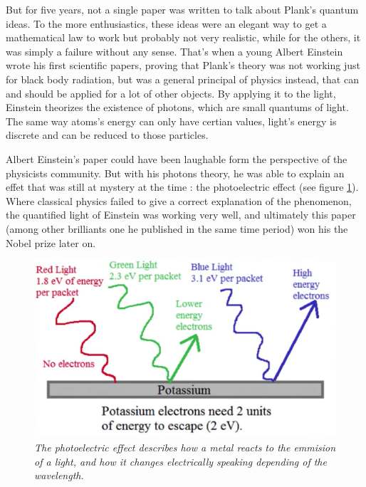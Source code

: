 \documentclass[a4paper,12pt]{report}
\newcommand{\para}[1]{\par{#1}\\}
\begin{document}
\para{
    But for five years, not a single paper was written to talk about Plank's quantum ideas. To the more enthusiastics, these ideas were an elegant way to get a mathematical law to work but probably not very realistic, while for the others, it was simply a failure without any sense. That's when a young Albert Einstein wrote his first scientific papers, proving that Plank's theory was not working just for black body radiation, but was a general principal of physics instead, that can and should be applied for a lot of other objects. By applying it to the light, Einstein theorizes the existence of photons, which are small quantums of light. The same way atoms's energy can only have certian values, light's energy is discrete and can be reduced to those particles.
}

\para{
    Albert Einstein's paper could have been laughable form the perspective of the physicists community. But with his photons theory, he was able to explain an effet that was still at mystery at the time : the photoelectric effect (see figure \ref{photoelectric}). Where classical physics failed to give a correct explanation of the phenomenon, the quantified light of Einstein was working very well, and ultimately this paper (among other brilliants one he published in the same time period) won his the Nobel prize later on.
}

\begin{figure}
	\begin{center}
		\includegraphics[scale=0.6]{images/photoelectric}
	\end{center}
	\caption{\textit{The photoelectric effect describes how a metal reacts to the emmision of a light, and how it changes electrically speaking depending of the wavelength.}}
	\label{photoelectric}
\end{figure}
\end{document}
